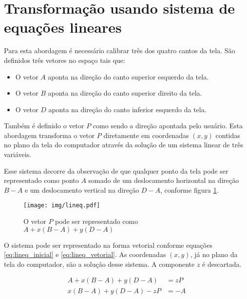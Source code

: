 \documentclass[brazil,pagestart=firstchapter]{abnt}
\begin{document}
\section{Transformação usando sistema de equações lineares}
\label{sec:coord_lineq}

Para esta abordagem é necessário calibrar três dos quatro cantos da tela.
São definidos três vetores no espaço tais que:

\begin{itemize}
\item O vetor $A$ aponta na direção do canto superior esquerdo da tela.
\item O vetor $B$ aponta na direção do canto superior direito da tela.
\item O vetor $D$ aponta na direção do canto inferior esquerdo da tela.
\end{itemize}

Também é definido o vetor $P$ como sendo a direção apontada pelo usuário.
Esta abordagem transforma o vetor $P$ diretamente em coordenadas $(x, y)$
contidas no plano da tela do computador através da solução de um sistema
linear de três variáveis.

Esse sistema decorre da observação de que qualquer ponto da tela pode ser
representado como ponto $A$ somado de um deslocamento horizontal na direção
$B-A$ e um deslocamento vertical na direção $D-A$, conforme figura
\ref{fig:lineq}.

\begin{figure}[h]
\centering
\texttt{[image: img/lineq.pdf]}
\caption{O vetor $P$ pode ser representado como $A + x(B-A) + y(D-A)$}
\label{fig:lineq}
\end{figure}

O sistema pode ser representado na forma vetorial conforme equações
\eqref{eq:lineq_inicial} e \eqref{eq:lineq_vetorial}. As coordenadas $(x,
y)$, já no plano da tela do computador, são a solução desse sistema. A
componente $z$ é descartada.

\begin{align}
\label{eq:lineq_inicial}
A + x (B-A) + y (D-A) & = z P  \\
\label{eq:lineq_vetorial}
x (B-A) + y (D-A) - z P & = -A
\end{align}

\end{document}
